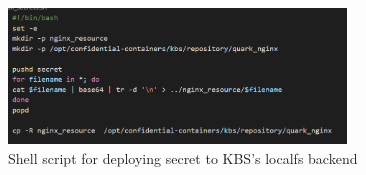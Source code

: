 \begin{figure}[H]
    \centering
    \includegraphics[width=0.8\textwidth]{images/kbs_secret_deployment.png}
    \caption[Shell script for deploying secret to KBS’s localfs backend]{Shell script for deploying secret to KBS’s localfs backend}
    \label{fig:kbs_secret_deployment}
\end{figure}


